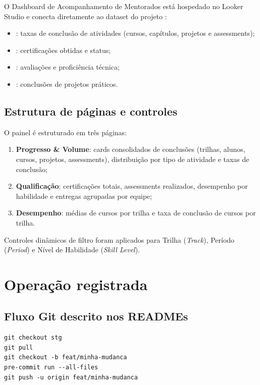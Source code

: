 \documentclass[11pt,a4paper]{article}
\begin{document}
O Dashboard de Acompanhamento de Mentorados está hospedado no Looker Studio e
conecta diretamente ao dataset  do projeto :

\begin{itemize}
  \item {}: taxas de conclusão de atividades (cursos, capítulos, projetos e assessments);
  \item {}: certificações obtidas e status;
  \item {}: avaliações e proficiência técnica;
  \item {}: conclusões de projetos práticos.
\end{itemize}

\subsection{Estrutura de páginas e controles}

O painel é estruturado em três páginas:
\begin{enumerate}
  \item \textbf{Progresso \& Volume}: cards consolidados de conclusões (trilhas, alunos, cursos, projetos, assessments), distribuição por tipo de atividade e taxas de conclusão;
  \item \textbf{Qualificação}: certificações totais, assessments realizados, desempenho por habilidade e entregas agrupadas por equipe;
  \item \textbf{Desempenho}: médias de cursos por trilha e taxa de conclusão de cursos por trilha.
\end{enumerate}

Controles dinâmicos de filtro foram aplicados para Trilha (\textit{Track}), Período (\textit{Period}) e Nível de Habilidade (\textit{Skill Level}).

\section{Operação registrada}

\subsection{Fluxo Git descrito nos READMEs}

\begin{lstlisting}
git checkout stg
git pull
git checkout -b feat/minha-mudanca
pre-commit run --all-files
git push -u origin feat/minha-mudanca
\end{lstlisting}
\end{document}
